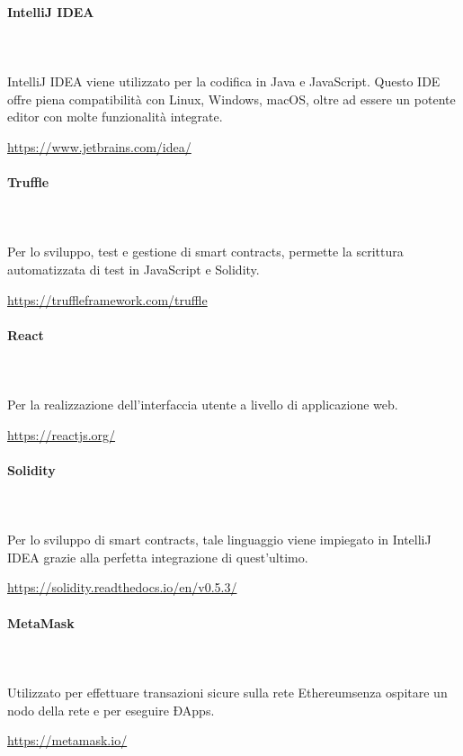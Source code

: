 \paragraph{IntelliJ IDEA} \mbox{}\\ \mbox{}\\
IntelliJ IDEA viene utilizzato per la codifica in Java e JavaScript. Questo 
IDE offre piena compatibilità con Linux, Windows, macOS, oltre ad essere un 
potente editor con molte funzionalità integrate. \newline
\centerline{\url{https://www.jetbrains.com/idea/}}

	
\paragraph{Truffle} \mbox{}\\ \mbox{}\\
Per lo sviluppo, test e gestione di smart contracts\glo, permette la scrittura automatizzata di test in JavaScript e Solidity\glo.\newline
\centerline{\url{https://truffleframework.com/truffle}}
\paragraph{React} \mbox{}\\ \mbox{}\\ 
Per la realizzazione dell'interfaccia utente a livello di applicazione web.\newline
\centerline{\url{https://reactjs.org/}}

\paragraph{Solidity} \mbox{}\\ \mbox{}\\ 
Per lo sviluppo di smart contracts\glo, tale linguaggio viene impiegato in IntelliJ IDEA grazie alla perfetta integrazione di quest'ultimo.\newline
\centerline{\url{https://solidity.readthedocs.io/en/v0.5.3/}}

\paragraph{MetaMask} \mbox{}\\ \mbox{}\\ 
Utilizzato per effettuare transazioni sicure sulla rete Ethereum\glosp senza ospitare un nodo della rete e per eseguire ÐApps\glo. \newline
\centerline{\url{https://metamask.io/}}

